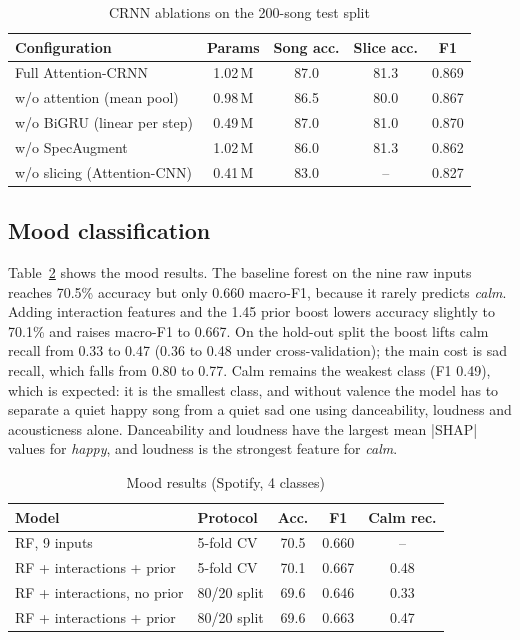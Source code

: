 \documentclass[conference]{IEEEtran}
\begin{document}
\begin{table}[t]
\caption{CRNN ablations on the 200-song test split}
\label{tab:ablation}
\centering
\setlength{\tabcolsep}{3.5pt}
\begin{tabular}{@{}lcccc@{}}
\toprule
Configuration & Params & Song acc. & Slice acc. & F1\\
\midrule
Full Attention-CRNN & 1.02\,M & 87.0 & 81.3 & 0.869\\
w/o attention (mean pool) & 0.98\,M & 86.5 & 80.0 & 0.867\\
w/o BiGRU (linear per step) & 0.49\,M & 87.0 & 81.0 & 0.870\\
w/o SpecAugment & 1.02\,M & 86.0 & 81.3 & 0.862\\
w/o slicing (Attention-CNN) & 0.41\,M & 83.0 & -- & 0.827\\
\bottomrule
\end{tabular}
\end{table}

\subsection{Mood classification}
Table~\ref{tab:mood} shows the mood results. The baseline forest on the nine raw inputs reaches 70.5\% accuracy but only 0.660 macro-F1, because it rarely predicts \emph{calm}. Adding interaction features and the 1.45 prior boost lowers accuracy slightly to 70.1\% and raises macro-F1 to 0.667. On the hold-out split the boost lifts calm recall from 0.33 to 0.47 (0.36 to 0.48 under cross-validation); the main cost is sad recall, which falls from 0.80 to 0.77. Calm remains the weakest class (F1 0.49), which is expected: it is the smallest class, and without valence the model has to separate a quiet happy song from a quiet sad one using danceability, loudness and acousticness alone. Danceability and loudness have the largest mean |SHAP| values for \emph{happy}, and loudness is the strongest feature for \emph{calm}.

\begin{table}[t]
\caption{Mood results (Spotify, 4 classes)}
\label{tab:mood}
\centering
\setlength{\tabcolsep}{4pt}
\begin{tabular}{@{}llccc@{}}
\toprule
Model & Protocol & Acc. & F1 & Calm rec.\\
\midrule
RF, 9 inputs & 5-fold CV & 70.5 & 0.660 & --\\
RF + interactions + prior & 5-fold CV & 70.1 & 0.667 & 0.48\\
RF + interactions, no prior & 80/20 split & 69.6 & 0.646 & 0.33\\
RF + interactions + prior & 80/20 split & 69.6 & 0.663 & 0.47\\
\bottomrule
\end{tabular}
\end{table}
\end{document}
